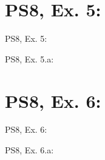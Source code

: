 \section{PS8, Ex. 5: }

\begin{frame}{PS8, Ex. 5: }
  \begin{multicols}{2}
    \vfill\null\columnbreak
    \vfill
  \end{multicols}
\end{frame}

\begin{frame}{PS8, Ex. 5.a: }
  \begin{multicols}{2}
    \vfill\null\columnbreak
    \vfill\null
  \end{multicols}
\end{frame}



\section{PS8, Ex. 6: }

\begin{frame}{PS8, Ex. 6: }
  \begin{multicols}{2}
    \vfill\null\columnbreak
    \vfill\null
  \end{multicols}
\end{frame}

\begin{frame}{PS8, Ex. 6.a: }
  \begin{multicols}{2}
    \vfill\null\columnbreak
    \vfill\null
  \end{multicols}
\end{frame}
